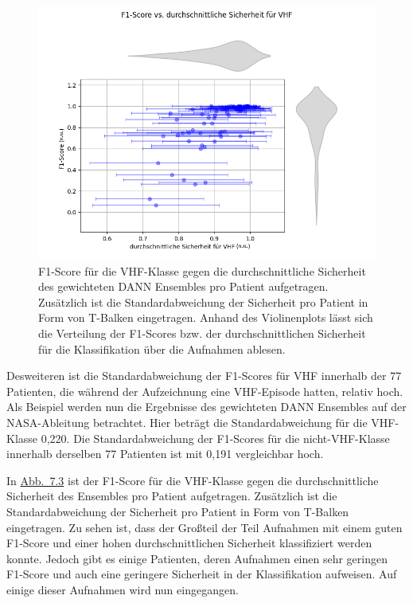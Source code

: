 \begin{figure}[!ht]%
\centering
	\includegraphics[width=1\textwidth]{./Bilder/shdb_plot_vhf.png}
\caption[SHDB-AF F1-Score vs. durchschnittliche Sicherheit für VHF]{F1-Score für die \gls{VHF}-Klasse gegen die durchschnittliche Sicherheit des gewichteten \gls{DANN} Ensembles pro Patient aufgetragen. Zusätzlich ist die Standardabweichung der Sicherheit pro Patient in Form von T-Balken eingetragen. Anhand des Violinenplots lässt sich die Verteilung der F1-Scores bzw. der durchschnittlichen Sicherheit für die Klassifikation über die Aufnahmen ablesen. } 
\label{fig:shdb_scatter_vhf}
\end{figure} 

Desweiteren ist die Standardabweichung der F1-Scores für \gls{VHF} innerhalb der 77 Patienten, die während der Aufzeichnung eine \gls{VHF}-Episode hatten, relativ hoch. Als Beispiel werden nun die Ergebnisse des gewichteten \gls{DANN} Ensembles auf der NASA-Ableitung betrachtet. Hier beträgt die Standardabweichung für die \gls{VHF}-Klasse 0,220. Die Standardabweichung der F1-Scores für die nicht-\gls{VHF}-Klasse innerhalb derselben 77 Patienten ist mit 0,191 vergleichbar hoch. 


In \hyperref[fig:shdb_scatter_vhf]{Abb.~7.3} ist der F1-Score für die \gls{VHF}-Klasse gegen die durchschnittliche Sicherheit des Ensembles pro Patient aufgetragen. Zusätzlich ist die Standardabweichung der Sicherheit pro Patient in Form von T-Balken eingetragen. Zu sehen ist, dass der Großteil der Teil Aufnahmen mit einem guten F1-Score und einer hohen durchschnittlichen Sicherheit klassifiziert werden konnte. Jedoch gibt es einige Patienten, deren Aufnahmen einen sehr geringen F1-Score und auch eine geringere Sicherheit in der Klassifikation aufweisen. Auf einige dieser Aufnahmen wird nun eingegangen.


